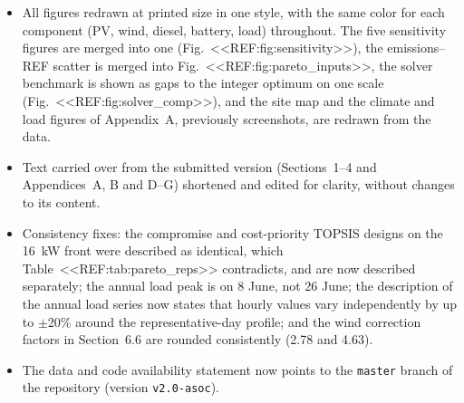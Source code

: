 \documentclass[11pt]{article}
\begin{document}
\begin{itemize}[leftmargin=*,itemsep=1pt]
\item All figures redrawn at printed size in one style, with the same color for each component (PV, wind, diesel, battery, load) throughout. The five sensitivity figures are merged into one (Fig.~<<REF:fig:sensitivity>>), the emissions--REF scatter is merged into Fig.~<<REF:fig:pareto_inputs>>, the solver benchmark is shown as gaps to the integer optimum on one scale (Fig.~<<REF:fig:solver_comp>>), and the site map and the climate and load figures of Appendix~A, previously screenshots, are redrawn from the data.
\item Text carried over from the submitted version (Sections~1--4 and Appendices~A, B and D--G) shortened and edited for clarity, without changes to its content.
\item Consistency fixes: the compromise and cost-priority TOPSIS designs on the 16~kW front were described as identical, which Table~<<REF:tab:pareto_reps>> contradicts, and are now described separately; the annual load peak is on 8 June, not 26 June; the description of the annual load series now states that hourly values vary independently by up to $\pm$20\% around the representative-day profile; and the wind correction factors in Section~6.6 are rounded consistently (2.78 and 4.63).
\item The data and code availability statement now points to the \texttt{master} branch of the repository (version \texttt{v2.0-asoc}).
\end{itemize}
\end{document}

